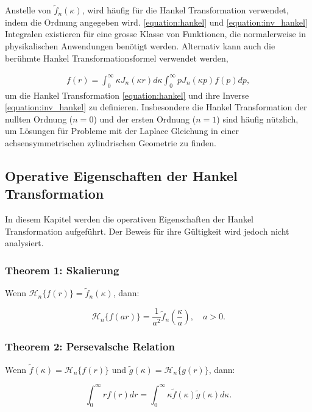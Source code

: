 Anstelle von $\tilde{f}_n(\kappa)$, wird häufig für die Hankel Transformation verwendet, indem die Ordnung angegeben wird.
\eqref{equation:hankel} und \eqref{equation:inv_hankel} Integralen existieren für eine grosse Klasse von Funktionen, die normalerweise in physikalischen Anwendungen benötigt werden.
Alternativ kann auch die berühmte Hankel Transformationsformel verwendet werden, 

\begin{align}
	f(r) = \int_{0}^{\infty}\kappa J_n(\kappa r) d\kappa \int_{0}^{\infty} p J_n(\kappa p)f(p) dp,
	\label{equation:hankel_integral_formula}
\end{align}
um die Hankel Transformation \eqref{equation:hankel} und ihre Inverse \eqref{equation:inv_hankel} zu definieren.
Insbesondere die Hankel Transformation der nullten Ordnung ($n=0$) und der ersten Ordnung ($n=1$) sind häufig nützlich, um Lösungen für Probleme mit der Laplace Gleichung in einer achsensymmetrischen zylindrischen Geometrie zu finden.

\subsection{Operative Eigenschaften der Hankel Transformation\label{sub:op_properties_hankel}}
In diesem Kapitel werden die operativen Eigenschaften der Hankel Transformation aufgeführt. Der Beweis für ihre Gültigkeit wird jedoch nicht analysiert.

\subsubsection{Theorem 1: Skalierung \label{subsub:skalierung}}
Wenn $\mathscr{H}_n\{f(r)\}=\tilde{f}_n(\kappa)$, dann:

\begin{equation*}
	\mathscr{H}_n\{f(ar)\}=\frac{1}{a^{2}}\tilde{f}_n \left(\frac{\kappa}{a}\right), \quad a>0.
\end{equation*}

\subsubsection{Theorem 2: Persevalsche Relation \label{subsub:perseval}}
Wenn $\tilde{f}(\kappa)=\mathscr{H}_n\{f(r)\}$ und $\tilde{g}(\kappa)=\mathscr{H}_n\{g(r)\}$, dann:

\begin{equation*}
	\int_{0}^{\infty}rf(r) dr = \int_{0}^{\infty}\kappa\tilde{f}(\kappa)\tilde{g}(\kappa) d\kappa.
\end{equation*}

